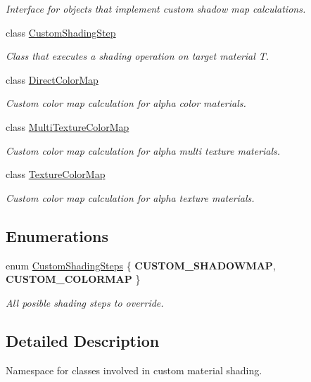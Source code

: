 \begin{DoxyCompactItemize}
\begin{DoxyCompactList}\small\item\em Interface for objects that implement custom shadow map calculations. \end{DoxyCompactList}\item 
class \mbox{\hyperlink{class_geometry_engine_1_1_custom_shading_1_1_custom_shading_step}{Custom\+Shading\+Step}}
\begin{DoxyCompactList}\small\item\em Class that executes a shading operation on target material T. \end{DoxyCompactList}\item 
class \mbox{\hyperlink{class_geometry_engine_1_1_custom_shading_1_1_direct_color_map}{Direct\+Color\+Map}}
\begin{DoxyCompactList}\small\item\em Custom color map calculation for alpha color materials. \end{DoxyCompactList}\item 
class \mbox{\hyperlink{class_geometry_engine_1_1_custom_shading_1_1_multi_texture_color_map}{Multi\+Texture\+Color\+Map}}
\begin{DoxyCompactList}\small\item\em Custom color map calculation for alpha multi texture materials. \end{DoxyCompactList}\item 
class \mbox{\hyperlink{class_geometry_engine_1_1_custom_shading_1_1_texture_color_map}{Texture\+Color\+Map}}
\begin{DoxyCompactList}\small\item\em Custom color map calculation for alpha texture materials. \end{DoxyCompactList}\end{DoxyCompactItemize}
\subsection*{Enumerations}
\begin{DoxyCompactItemize}
\item 
\mbox{\label{namespace_geometry_engine_1_1_custom_shading_a2dc236a5b567da5099069ce2b2be5609}} 
enum \mbox{\hyperlink{namespace_geometry_engine_1_1_custom_shading_a2dc236a5b567da5099069ce2b2be5609}{Custom\+Shading\+Steps}} \{ {\bfseries C\+U\+S\+T\+O\+M\+\_\+\+S\+H\+A\+D\+O\+W\+M\+AP}, 
{\bfseries C\+U\+S\+T\+O\+M\+\_\+\+C\+O\+L\+O\+R\+M\+AP}
 \}
\begin{DoxyCompactList}\small\item\em All posible shading steps to override. \end{DoxyCompactList}\end{DoxyCompactItemize}


\subsection{Detailed Description}
Namespace for classes involved in custom material shading. 